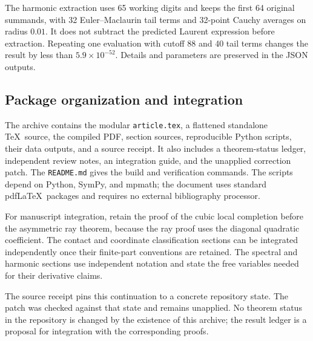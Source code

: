 \documentclass[11pt,a4paper]{article}
\theoremstyle{definition}
\theoremstyle{remark}
\numberwithin{equation}{section}
\begin{document}
The harmonic extraction uses 65 working digits and keeps the first
64 original summands, with 32 Euler--Maclaurin tail terms and
32-point Cauchy averages on radius $0.01$. It does not subtract the
predicted Laurent expression before extraction. Repeating one
evaluation with cutoff 88 and 40 tail terms changes the result by
less than $5.9\times10^{-52}$. Details and parameters are preserved
in the JSON outputs.

\subsection{Package organization and integration}

The archive contains the modular \texttt{article.tex}, a flattened
standalone \TeX\ source, the compiled PDF, section sources,
reproducible Python scripts, their data outputs, and a source receipt.
It also includes a theorem-status ledger, independent review notes,
an integration guide, and the unapplied correction patch.
The \texttt{README.md} gives the build and verification commands.
The scripts depend on Python, SymPy, and mpmath; the document uses
standard pdf\LaTeX\ packages and requires no external bibliography
processor.

For manuscript integration, retain the proof of the cubic local
completion before the asymmetric ray theorem, because the ray proof
uses the diagonal quadratic coefficient. The contact and coordinate
classification sections can be integrated independently once their
finite-part conventions are retained. The spectral and harmonic
sections use independent notation and state the free variables
needed for their derivative claims.

The source receipt pins this continuation to a concrete repository
state. The patch was checked against that state and remains
unapplied. No theorem status in the repository is changed by the
existence of this archive; the result ledger is a proposal for
integration with the corresponding proofs.

\end{document}
